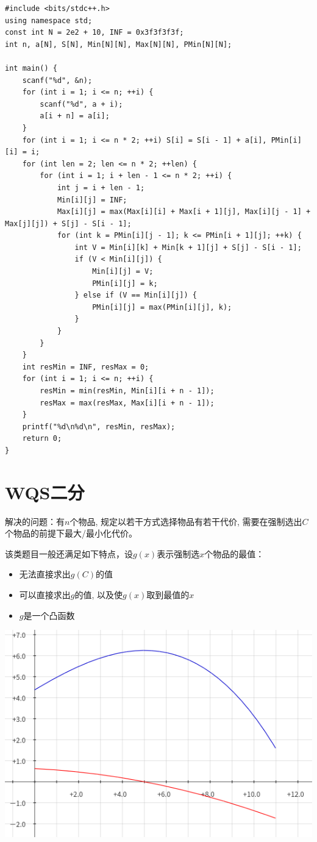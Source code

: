 \begin{lstlisting}
#include <bits/stdc++.h>
using namespace std;
const int N = 2e2 + 10, INF = 0x3f3f3f3f;
int n, a[N], S[N], Min[N][N], Max[N][N], PMin[N][N];

int main() {
	scanf("%d", &n);
	for (int i = 1; i <= n; ++i) {
		scanf("%d", a + i);
		a[i + n] = a[i];
	}
	for (int i = 1; i <= n * 2; ++i) S[i] = S[i - 1] + a[i], PMin[i][i] = i;
	for (int len = 2; len <= n * 2; ++len) {
		for (int i = 1; i + len - 1 <= n * 2; ++i) {
			int j = i + len - 1;
			Min[i][j] = INF;
			Max[i][j] = max(Max[i][i] + Max[i + 1][j], Max[i][j - 1] + Max[j][j]) + S[j] - S[i - 1];
			for (int k = PMin[i][j - 1]; k <= PMin[i + 1][j]; ++k) {
				int V = Min[i][k] + Min[k + 1][j] + S[j] - S[i - 1];
				if (V < Min[i][j]) {
					Min[i][j] = V;
					PMin[i][j] = k;
				} else if (V == Min[i][j]) {
					PMin[i][j] = max(PMin[i][j], k);
				}
			}
		}
	}
	int resMin = INF, resMax = 0;
	for (int i = 1; i <= n; ++i) {
		resMin = min(resMin, Min[i][i + n - 1]);
		resMax = max(resMax, Max[i][i + n - 1]);
	}
	printf("%d\n%d\n", resMin, resMax);
	return 0;
}
\end{lstlisting}



\section{WQS二分}

解决的问题：有$n$个物品, 规定以若干方式选择物品有若干代价, 需要在强制选出$C$个物品的前提下最大/最小化代价。\par
该类题目一般还满足如下特点，设$g(x)$表示强制选$x$个物品的最值：

\begin{itemize}
\item 无法直接求出$g(C)$的值
\item 可以直接求出$g$的值, 以及使$g(x)$取到最值的$x$
\item $g$是一个凸函数
\end{itemize}

\begin{center}
\includegraphics[scale=0.5]{images/wqs.png} %
\end{center}


